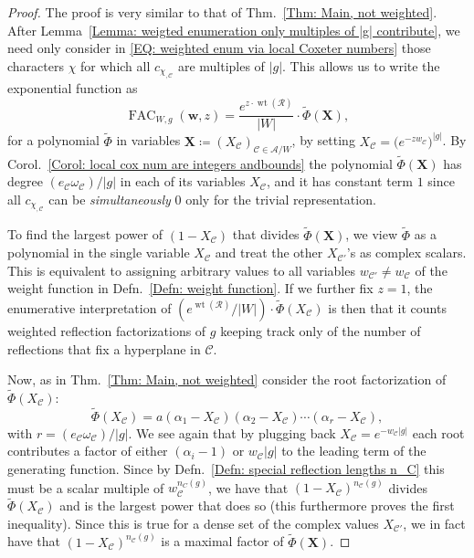 \documentclass[ALCO, Unicode]{cedram}
\newcommand{\op}[1]{\operatorname{#1}}
\newcommand{\op}[1]{\operatorname{#1}}
\begin{document}
\begin{proof}
The proof is very similar to that of Thm.~\ref{Thm: Main, not weighted}. After Lemma~\ref{Lemma: weigted enumeration only multiples of |g| contribute}, we need only consider in \eqref{EQ: weighted enum via local Coxeter numbers} those characters $\chi$ for which all $c_{\chi_{,\mathcal{C}}}$ are multiples of $|g|$. This allows us to write the exponential function as $$\op{FAC}_{W,g}(\bm w,z)=\dfrac{e^{z\cdot\op{wt}(\mathcal{R})}}{|W|}\cdot\tilde{\Phi}(\bm X),$$ for a polynomial $\tilde{\Phi}$ in variables $\bm X\coloneqq (X_{\mathcal{C}})_{\mathcal{C}\in\mathcal{A}/W}$, by setting $X_{\mathcal{C}}=\big( e^{-zw_{\mathcal{C}}^{\phantom{l_r}}}\big)^{|g|}$. By Corol.~\ref{Corol: local cox num are integers andbounds} the polynomial $\tilde{\Phi}(\bm X)$ has degree $(e_{\mathcal{C}}\omega_{\mathcal{C}})/|g|$ in each of its variables $X_{\mathcal{C}}$, and it has constant term $1$ since all $c_{\chi_{,\mathcal{C}}}$ can be {\it simultaneously} $0$ only for the trivial representation.

To find the largest power of $(1-X_{\mathcal{C}})$ that divides $\tilde{\Phi}(\bm X)$, we view $\tilde{\Phi}$ as a polynomial in the single variable $X_{\mathcal{C}}$ and treat the other $X_{\mathcal{C}'}$'s as complex scalars. This is equivalent to assigning arbitrary values to all variables $w_{\mathcal{C}'}\neq w_{\mathcal{C}}$ of the weight function in Defn.~\ref{Defn: weight function}. If we further fix $z=1$, the enumerative interpretation of $(e^{\op{wt}(\mathcal{R})}/|W|)\cdot\tilde{\Phi}(X_{\mathcal{C}})$ is then that it counts weighted reflection factorizations of $g$ keeping track only of the number of reflections that fix a hyperplane in $\mathcal{C}$.

Now, as in Thm.~\ref{Thm: Main, not weighted} consider the root factorization of $\tilde{\Phi}(X_{\mathcal{C}})$: $$\tilde{\Phi}(X_{\mathcal{C}})=a(\alpha_1-X_\mathcal{C})(\alpha_2-X_{\mathcal{C}})\cdots (\alpha_r-X_{\mathcal{C}}),$$ with $r=(e_{\mathcal{C}}\omega_{\mathcal{C}})/|g|$. We see again that by plugging back $X_{\mathcal{C}}=e^{-w_{\mathcal{C}}|g|}$ each root contributes a factor of either $(\alpha_i-1)$ or $w_{\mathcal{C}}|g|$ to the leading term of the generating function. Since by Defn.~\ref{Defn: special reflection lengths n_C} this must be a scalar multiple of $w_{\mathcal{C}}^{n_C(g)}$, we have that $(1-X_{\mathcal{C}})^{n_{\mathcal{C}}(g)}$ divides $\tilde{\Phi}(X_{\mathcal{C}})$ and is the largest power that does so (this furthermore proves the first inequality). Since this is true for a dense set of the complex values $X_{\mathcal{C}'}$, we in fact have that $(1-X_{\mathcal{C}})^{n_{\mathcal{C}}(g)}$ is a maximal factor of $\tilde{\Phi}(\bm X)$.


\end{proof}
\end{document}
